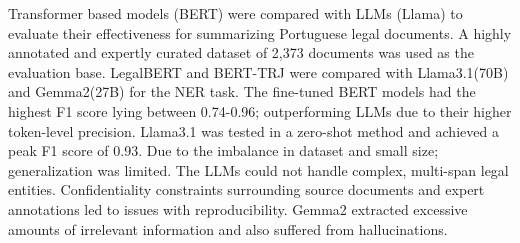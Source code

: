 Transformer based models (BERT) were compared with LLMs (Llama) to evaluate their effectiveness for summarizing Portuguese legal documents. A highly annotated and expertly curated dataset of 2,373 documents was used as the evaluation base. LegalBERT and BERT-TRJ were compared with Llama3.1(70B) and Gemma2(27B) for the NER task. The fine-tuned BERT models had the highest F1 score lying between 0.74-0.96\cite{b25}; outperforming LLMs due to their higher token-level precision. Llama3.1 was tested in a zero-shot method and achieved a peak F1 score of 0.93. Due to the imbalance in dataset and small size; generalization was limited. The LLMs could not handle complex, multi-span legal entities. Confidentiality constraints surrounding source documents and expert annotations led to issues with reproducibility. Gemma2 extracted excessive amounts of irrelevant information and also suffered from hallucinations.


\vspace{6pt}




\pagebreak

